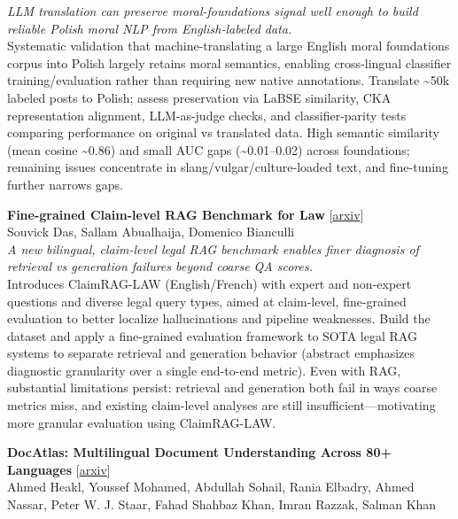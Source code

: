 \documentclass[12pt,letterpaper]{article}
\begin{document}
{\small\textit{LLM translation can preserve moral-foundations signal well enough to build reliable Polish moral NLP from English-labeled data.}}\\[1pt]
{\footnotesize Systematic validation that machine-translating a large English moral foundations corpus into Polish largely retains moral semantics, enabling cross-lingual classifier training/evaluation rather than requiring new native annotations. Translate \textasciitilde{}50k labeled posts to Polish; assess preservation via LaBSE similarity, CKA representation alignment, LLM-as-judge checks, and classifier-parity tests comparing performance on original vs translated data. High semantic similarity (mean cosine \textasciitilde{}0.86) and small AUC gaps (\textasciitilde{}0.01--0.02) across foundations; remaining issues concentrate in slang/vulgar/culture-loaded text, and fine-tuning further narrows gaps.}

\medskip

{\small\textbf{Fine-grained Claim-level RAG Benchmark for Law}} {\scriptsize[\href{https://arxiv.org/abs/2605.21071}{arxiv}]}\\
{\scriptsize Souvick Das, Sallam Abualhaija, Domenico Bianculli}\\

{\small\textit{A new bilingual, claim-level legal RAG benchmark enables finer diagnosis of retrieval vs generation failures beyond coarse QA scores.}}\\[1pt]
{\footnotesize Introduces ClaimRAG-LAW (English/French) with expert and non-expert questions and diverse legal query types, aimed at claim-level, fine-grained evaluation to better localize hallucinations and pipeline weaknesses. Build the dataset and apply a fine-grained evaluation framework to SOTA legal RAG systems to separate retrieval and generation behavior (abstract emphasizes diagnostic granularity over a single end-to-end metric). Even with RAG, substantial limitations persist: retrieval and generation both fail in ways coarse metrics miss, and existing claim-level analyses are still insufficient---motivating more granular evaluation using ClaimRAG-LAW.}

\medskip

{\small\textbf{DocAtlas: Multilingual Document Understanding Across 80+ Languages}} {\scriptsize[\href{https://arxiv.org/abs/2605.12623}{arxiv}]}\\
{\scriptsize Ahmed Heakl, Youssef Mohamed, Abdullah Sohail, Rania Elbadry, Ahmed Nassar, Peter W. J. Staar, Fahad Shahbaz Khan, Imran Razzak, Salman Khan}\\
\end{document}

